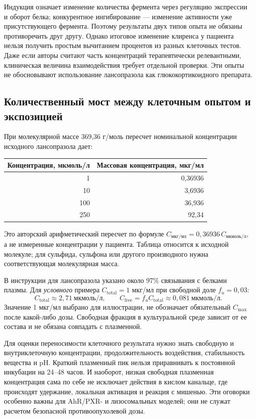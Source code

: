 \documentclass[11pt,a4paper,notitlepage]{report}
\newcommand{\src}[1]{\unskip\space\cite{#1}}
\begin{document}
Индукция означает изменение количества фермента через регуляцию экспрессии и оборот белка; конкурентное ингибирование --- изменение активности уже присутствующего фермента. Поэтому результаты двух типов опыта не обязаны противоречить друг другу. Однако итоговое изменение клиренса у пациента нельзя получить простым вычитанием процентов из разных клеточных тестов. Даже если авторы считают часть концентраций терапевтически релевантными, клиническая величина взаимодействия требует отдельной проверки. Эти опыты не обосновывают использование лансопразола как глюкокортикоидного препарата.\src{molpxr,molcypinhib}

\subsection{Количественный мост между клеточным опытом и экспозицией}
При молекулярной массе 369,36 г/моль пересчет номинальной концентрации исходного лансопразола дает:
\begin{center}
\begin{tabular}{rr}
\toprule
Концентрация, мкмоль/л & Массовая концентрация, мкг/мл \\
\midrule
1 & 0,36936 \\
10 & 3,6936 \\
100 & 36,936 \\
250 & 92,34 \\
\bottomrule
\end{tabular}
\end{center}
Это авторский арифметический пересчет по формуле $C_{\text{мкг/мл}}=0{,}36936\,C_{\text{мкмоль/л}}$, а не измеренные концентрации у пациента. Таблица относится к исходной молекуле; для сульфида, сульфона или другого производного нужна соответствующая молекулярная масса.\src{uslabel}

В инструкции для лансопразола указано около 97\% связывания с белками плазмы. Для \emph{условного} примера $C_{\mathrm{total}}=1$ мкг/мл при свободной доле $f_u=0{,}03$:
\[
C_{\mathrm{total}}\approx2{,}71\ \text{мкмоль/л},
\qquad
C_{\mathrm{free}}=f_u C_{\mathrm{total}}
\approx0{,}081\ \text{мкмоль/л}.
\]
Значение 1 мкг/мл выбрано для иллюстрации, не обозначает обязательный $C_{\max}$ после какой-либо дозы. Свободная фракция в культуральной среде зависит от ее состава и не обязана совпадать с плазменной.\src{pharmalabel}

Для оценки переносимости клеточного результата нужно знать свободную и внутриклеточную концентрации, продолжительность воздействия, стабильность вещества и pH. Краткий плазменный пик нельзя приравнивать к постоянной инкубации на 24--48 часов. И наоборот, низкая свободная плазменная концентрация сама по себе не исключает действия в кислом канальце, где происходят удержание, локальная активация и реакция с мишенью. Эти оговорки особенно важны для AhR/PXR- и лизосомальных моделей; они не служат расчетом безопасной противоопухолевой дозы.\src{molahr,molpxr,mollysosome,molchem}
\end{document}
